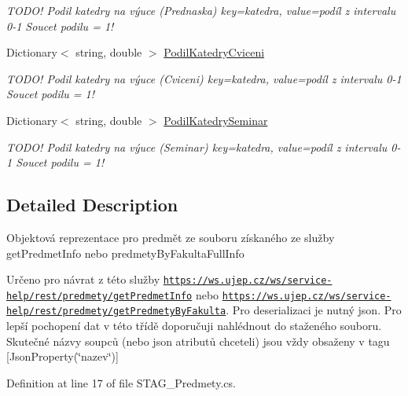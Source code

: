 \begin{DoxyCompactItemize}
\begin{DoxyCompactList}\small\item\em T\+O\+D\+O! Podil katedry na výuce (Prednaska) key=katedra, value=podíl z intervalu 0-\/1 Soucet podilu = 1! \end{DoxyCompactList}\item 
Dictionary$<$ string, double $>$ \hyperlink{class_analyza_rozvrhu_1_1_s_t_a_g___classes_1_1_predmet_a09f7881d278dfe8fceba719ce6e4caa1}{Podil\+Katedry\+Cviceni}
\begin{DoxyCompactList}\small\item\em T\+O\+D\+O! Podil katedry na výuce (Cviceni) key=katedra, value=podíl z intervalu 0-\/1 Soucet podilu = 1! \end{DoxyCompactList}\item 
Dictionary$<$ string, double $>$ \hyperlink{class_analyza_rozvrhu_1_1_s_t_a_g___classes_1_1_predmet_a03255074fb9e471f282305d05a742418}{Podil\+Katedry\+Seminar}
\begin{DoxyCompactList}\small\item\em T\+O\+D\+O! Podil katedry na výuce (Seminar) key=katedra, value=podíl z intervalu 0-\/1 Soucet podilu = 1! \end{DoxyCompactList}\end{DoxyCompactItemize}


\subsection{Detailed Description}
Objektová reprezentace pro predmět ze souboru získaného ze služby get\+Predmet\+Info nebo predmety\+By\+Fakulta\+Full\+Info 

Určeno pro návrat z této služby \href{https://ws.ujep.cz/ws/service-help/rest/predmety/getPredmetInfo}{\tt https\+://ws.\+ujep.\+cz/ws/service-\/help/rest/predmety/get\+Predmet\+Info} nebo \href{https://ws.ujep.cz/ws/service-help/rest/predmety/getPredmetyByFakulta}{\tt https\+://ws.\+ujep.\+cz/ws/service-\/help/rest/predmety/get\+Predmety\+By\+Fakulta}. Pro deserializaci je nutný json. Pro lepší pochopení dat v této třídě doporučuji nahlédnout do staženého souboru. Skutečné názvy soupců (nebo json atributů chceteli) jsou vždy obsaženy v tagu \mbox{[}Json\+Property(\char`\"{}nazev\char`\"{})\mbox{]} 

Definition at line 17 of file S\+T\+A\+G\+\_\+\+Predmety.\+cs.



